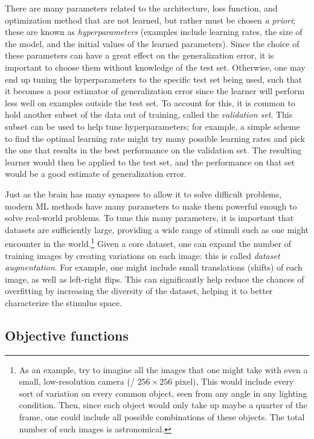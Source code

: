 There are many parameters related to the architecture, loss function,
and optimization method that are not learned,
but rather must be chosen \emph{a priori};
these are known as \emph{hyperparameters}
(examples include learning rates, the size of the model,
and the initial values of the learned parameters).
Since the choice of these parameters
can have a great effect on the generalization error,
it is important to choose them without knowledge of the test set.
Otherwise, one may end up tuning the hyperparameters
to the specific test set being used,
such that it becomes a poor estimator of generalization error
since the learner will perform less well on examples outside the test set.
To account for this, it is common to hold another subset of the data
out of training,
called the \emph{validation set}.
This subset can be used to help tune hyperparameters;
for example, a simple scheme to find the optimal learning rate
might try many possible learning rates
and pick the one that results in the best performance on the validation set.
The resulting learner would then be applied to the test set,
and the performance on that set would be a good estimate
of generalization error.


Just as the brain has many synapses to allow it to solve difficult problems,
modern ML methods have many parameters to make them powerful enough to solve
real-world problems.
To tune this many parameters,
it is important that datasets are sufficiently large,
providing a wide range of stimuli such as one might encounter in the world.\footnote{
  As an example, try to imagine all the images that one might take
  with even a small, low-resolution camera (\eg/ $256 \times 256$ pixel),
  This would include every sort of variation on every common object,
  seen from any angle in any lighting condition.
  Then, since each object would only take up maybe a quarter of the frame,
  one could include all possible combinations of these objects.
  The total number of such images is astronomical.}
Given a core dataset, one can expand the number of training images
by creating variations on each image:
this is called \emph{dataset augmentation}.
For example, one might include small translations (shifts) of each image,
as well as left-right flips.
This can significantly help reduce the chances of overfitting
by increasing the diversity of the dataset,
helping it to better characterize the stimulus space.


\subsection{Objective functions}

